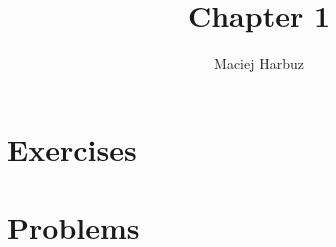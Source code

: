 \documentclass[12pt, a4paper]{article}
\title{Chapter 1}
\author{Maciej Harbuz}
\begin{document}
\maketitle

\section{Exercises}
%






\section{Problems}






\end{document}
